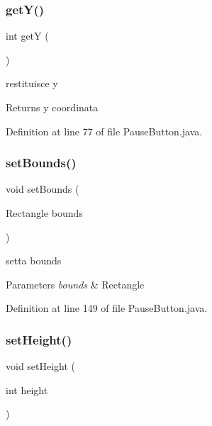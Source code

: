 \subsubsection{\texorpdfstring{get\+Y()}{getY()}}
{\footnotesize\ttfamily int getY (\begin{DoxyParamCaption}{ }\end{DoxyParamCaption})}



restituisce y 

\begin{DoxyReturn}{Returns}
y coordinata 
\end{DoxyReturn}


Definition at line 77 of file Pause\+Button.\+java.

\mbox{\label{classui_1_1_pause_button_a5871f92fa24387a8bcc54b945854b5ca}} 
\subsubsection{\texorpdfstring{set\+Bounds()}{setBounds()}}
{\footnotesize\ttfamily void set\+Bounds (\begin{DoxyParamCaption}\item[{Rectangle}]{bounds }\end{DoxyParamCaption})}



setta bounds 


\begin{DoxyParams}{Parameters}
{\em bounds} & Rectangle \\
\hline
\end{DoxyParams}


Definition at line 149 of file Pause\+Button.\+java.

\mbox{\label{classui_1_1_pause_button_a7013185ad2825ade83994b396c4fdfcd}} 
\subsubsection{\texorpdfstring{set\+Height()}{setHeight()}}
{\footnotesize\ttfamily void set\+Height (\begin{DoxyParamCaption}\item[{int}]{height }\end{DoxyParamCaption})}



